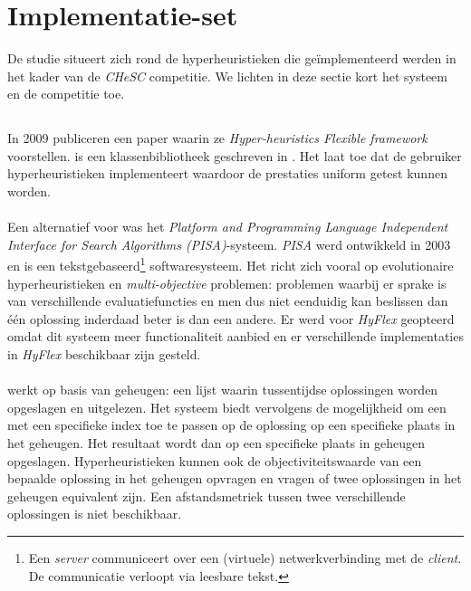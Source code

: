 \section{Implementatie-set}

De studie situeert zich rond de hyperheuristieken die ge\"implementeerd werden in het kader van de \emph{CHeSC} competitie. We lichten in deze sectie kort het systeem en de competitie toe.

\subsection{\abhf{}}

In 2009 publiceren  een paper waarin ze \emph{Hyper-heuristics Flexible framework \abhf{}} voorstellen. \abhf{} is een klassenbibliotheek geschreven in \abjava{}. Het laat toe dat de gebruiker hyperheuristieken implementeert waardoor de prestaties uniform getest kunnen worden.

\paragraph{}
Een alternatief voor \abhf{} was het \emph{Platform and Programming Language Independent Interface for Search Algorithms (PISA)}-systeem\cite{Bleuler03pisa-}. \emph{PISA} werd ontwikkeld in 2003 en is een tekstgebaseerd\footnote{Een \emph{server} communiceert over een (virtuele) netwerkverbinding met de \emph{client}. De communicatie verloopt via leesbare tekst.} softwaresysteem. Het richt zich vooral op evolutionaire hyperheuristieken en \emph{multi-objective} problemen: problemen waarbij er sprake is van verschillende evaluatiefuncties en men dus niet eenduidig kan beslissen dan \'e\'en oplossing inderdaad beter is dan een andere. Er werd voor \emph{HyFlex} geopteerd omdat dit systeem meer functionaliteit aanbied en er verschillende implementaties in \emph{HyFlex} beschikbaar zijn gesteld.

\paragraph{}
\abhf{} werkt op basis van geheugen: een lijst waarin tussentijdse oplossingen worden opgeslagen en uitgelezen. Het systeem biedt vervolgens de mogelijkheid om een \abllh{} met een specifieke index toe te passen op de oplossing op een specifieke plaats in het geheugen. Het resultaat wordt dan op een specifieke plaats in geheugen opgeslagen. Hyperheuristieken kunnen ook de objectiviteitswaarde van een bepaalde oplossing in het geheugen opvragen en vragen of twee oplossingen in het geheugen equivalent zijn. Een afstandsmetriek tussen twee verschillende oplossingen is niet beschikbaar.

